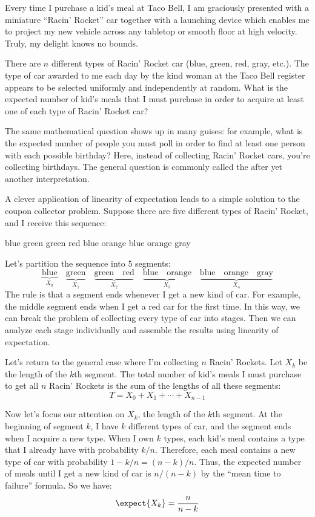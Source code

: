 Every time I purchase a kid's meal at Taco Bell, I am graciously presented
with a miniature ``Racin' Rocket'' car together with a launching device
which enables me to project my new vehicle across any tabletop or smooth
floor at high velocity.  Truly, my delight knows no bounds.

There are $n$ different types of Racin' Rocket car (blue, green, red,
gray, etc.).  The type of car awarded to me each day by the kind woman
at the Taco Bell register appears to be selected uniformly and
independently at random.  What is the expected number of kid's meals
that I must purchase in order to acquire at least one of each type of
Racin' Rocket car?

The same mathematical question shows up in many guises: for example,
what is the expected number of people you must poll in order to find
at least one person with each possible birthday?  Here, instead of
collecting Racin' Rocket cars, you're collecting birthdays.  The
general question is commonly called the  after yet another interpretation.

A clever application of linearity of expectation leads to a simple
solution to the coupon collector problem.  Suppose there are five
different types of Racin' Rocket, and I receive this sequence:
%
\begin{center}
blue \quad green \quad green \quad red \quad blue \quad orange \quad blue \quad orange \quad gray
\end{center}
%
Let's partition the sequence into 5 segments:
%
\[
\underbrace{\text{blue}}_{X_0} \quad
\underbrace{\text{green}}_{X_1} \quad
\underbrace{\text{green} \quad \text{red}}_{X_2} \quad
\underbrace{\text{blue} \quad \text{orange}}_{X_3} \quad
\underbrace{\text{blue} \quad \text{orange} \quad \text{gray}}_{X_4}
\]
%
The rule is that a segment ends whenever I get a new kind of car.  For
example, the middle segment ends when I get a red car for the first
time.  In this way, we can break the problem of collecting every type
of car into stages.  Then we can analyze each stage individually and
assemble the results using linearity of expectation.

Let's return to the general case where I'm collecting $n$ Racin'
Rockets.  Let $X_k$ be the length of the $k$th segment.  The total
number of kid's meals I must purchase to get all $n$ Racin' Rockets is
the sum of the lengths of all these segments:
%
\[
T = X_0 + X_1 + \cdots + X_{n-1}
\]

Now let's focus our attention on $X_k$, the length of the $k$th segment.
At the beginning of segment $k$, I have $k$ different types of car, and
the segment ends when I acquire a new type.  When I own $k$ types, each
kid's meal contains a type that I already have with probability $k / n$.
Therefore, each meal contains a new type of car with probability $1 - k /
n = (n - k) / n$.  Thus, the expected number of meals until I get a new
kind of car is $n / (n - k)$ by the ``mean time to failure'' formula.  So
we have:
%
\[
\expect{X_k} = \frac{n}{n - k}
\]

